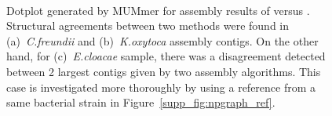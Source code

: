 \begin{figure}[!hpt]
\centering
{}
\hfill
{}
\\
\caption[Dotplot generated by MUMmer for assembly results of \unicycler{} versus \npgraph{}.]{Dotplot generated by MUMmer for assembly results of \unicycler{} versus \npgraph{}. Structural agreements between two methods were found in (a)~\emph{C.freundii} and (b)~\emph{K.oxytoca} assembly contigs. On the other hand, for (c)~\emph{E.cloacae} sample, there was a disagreement detected between 2 largest contigs given by two assembly algorithms. This case is investigated more thoroughly by using a reference from a same bacterial strain in Figure~\ref{supp_fig:npgraph_ref}.}
\label{supp_fig:npgraph_dotplot}
\end{figure}

